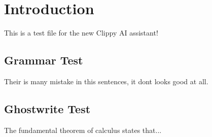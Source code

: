 \documentclass{article}
\begin{document}
\section{Introduction}

This is a test file for the new Clippy AI assistant!

\subsection{Grammar Test}
Their is many mistake in this sentences, it dont looks good at all.

\subsection{Ghostwrite Test}
The fundamental theorem of calculus states that...
\end{document}

